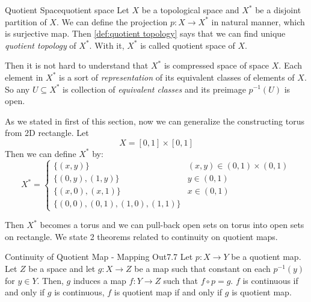 \documentclass[12pt, a4paper, twoside]{article}
\theoremstyle{plain}
\begin{document}
\begin{defn}{Quotient Space}{quotient space}
    Let $X$ be a topological space and $X^*$ be a disjoint partition of $X$. 
    We can define the projection $p: X \rightarrow X^*$ in natural manner, which is surjective map. 
    Then \ref{def:quotient topology} says that we can find unique \textit{quotient topology} of $X^*$. 
    With it, $X^*$ is called quotient space of $X$. 
\end{defn}

Then it is not hard to understand that $X^*$ is compressed space of space $X$. 
Each element in $X^*$ is a sort of \textit{representation} of its equivalent classes of elements of $X$. 
So any $U \subseteq X^*$ is collection of \textit{equivalent classes} and its preimage $p^{-1}(U)$ is open. 

As we stated in first of this section, now we can generalize the constructing torus from 2D rectangle. 
Let 
\[X = [0,1] \times [0,1]\]
Then we can define $X^*$ by: 
\[X^* = \begin{cases}
    \{(x, y)\} & (x,y) \in (0,1) \times (0,1) \\
    \{(0, y), (1, y)\} & y \in (0,1) \\
    \{(x, 0), (x, 1)\} & x \in (0, 1) \\
    \{(0, 0), (0, 1), (1, 0), (1, 1)\}
\end{cases}\]

Then $X^*$ becomes a torus and we can pull-back open sets on torus into open sets on rectangle. 
We state 2 theorems related to continuity on quotient maps. 

\newpage 

\begin{thm}{Continuity of Quotient Map - Mapping Out}{7.7}
    Let $p: X \rightarrow Y$ be a quotient map. 
    Let $Z$ be a space and let $g: X \rightarrow Z$ be a map such that constant on each $p^{-1}(y)$ for $y \in Y$. 
    Then, $g$ induces a map $f: Y \rightarrow Z$ such that $f \circ p = g$. 
    $f$ is continuous if and only if $g$ is continuous, $f$ is quotient map if and only if $g$ is quotient map.
\end{thm}

\begin{center}
\end{center}
\end{document}
